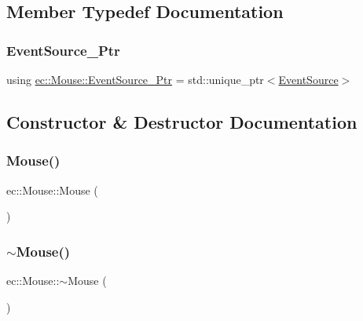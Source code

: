 \subsection{Member Typedef Documentation}
\mbox{\label{classec_1_1_mouse_a6aa210c1821f23f8685a544a587ae11a}} 
\subsubsection{\texorpdfstring{Event\+Source\+\_\+\+Ptr}{EventSource\_Ptr}}
{\footnotesize\ttfamily using \mbox{\hyperlink{classec_1_1_mouse_a6aa210c1821f23f8685a544a587ae11a}{ec\+::\+Mouse\+::\+Event\+Source\+\_\+\+Ptr}} =  std\+::unique\+\_\+ptr$<$\mbox{\hyperlink{classec_1_1_event_source}{Event\+Source}}$>$}



\subsection{Constructor \& Destructor Documentation}
\mbox{\label{classec_1_1_mouse_ac1154831feadd646ecabad6dc1d42136}} 
\subsubsection{\texorpdfstring{Mouse()}{Mouse()}}
{\footnotesize\ttfamily ec\+::\+Mouse\+::\+Mouse (\begin{DoxyParamCaption}{ }\end{DoxyParamCaption})\hspace{0.3cm}{\ttfamily [explicit]}}

\mbox{\label{classec_1_1_mouse_a49441335e64c7bf098217f0698975aa4}} 
\subsubsection{\texorpdfstring{$\sim$\+Mouse()}{~Mouse()}}
{\footnotesize\ttfamily ec\+::\+Mouse\+::$\sim$\+Mouse (\begin{DoxyParamCaption}{ }\end{DoxyParamCaption})}



